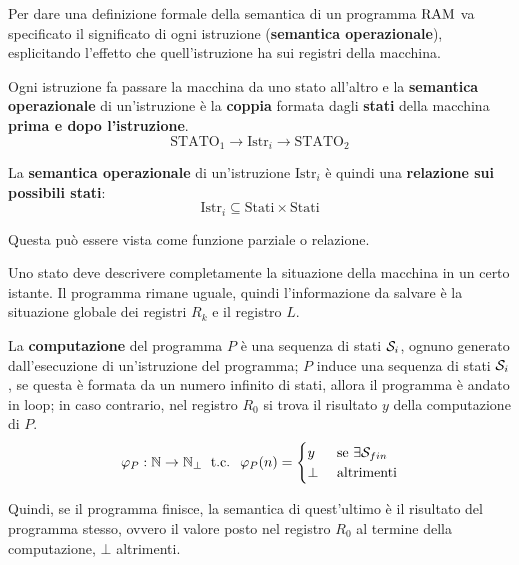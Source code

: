 Per dare una definizione formale della semantica di un programma $\text{RAM}$ va specificato il significato di ogni istruzione (\textbf{semantica operazionale}), esplicitando l'effetto che quell'istruzione ha sui registri della macchina.

Ogni istruzione fa passare la macchina da uno stato all'altro e la \textbf{semantica operazionale} di un'istruzione è la \textbf{coppia} formata dagli \textbf{stati} della macchina \textbf{prima e dopo l'istruzione}.
$$ \text{STATO}_1 \rightarrow \boxed{\text{Istr}_i} \rightarrow \text{STATO}_2 $$

La \textbf{semantica operazionale} di un'istruzione $\text{Istr}_i$ è quindi una \textbf{relazione sui possibili stati}:
$$
\text{Istr}_i \subseteq \text{Stati} \times \text{Stati}
$$

Questa può essere vista come funzione parziale o relazione.

Uno stato deve descrivere completamente la situazione della macchina in un certo istante. Il programma rimane uguale, quindi l'informazione da salvare è la situazione globale dei registri $R_k$ e il registro $L$.

La \textbf{computazione} del programma $P$ è una sequenza di stati $\mathcal{S}_i$, ognuno generato dall'esecuzione di un'istruzione del programma; $P$ induce una sequenza di stati $\mathcal{S}_i$, se questa è formata da un numero infinito di stati, allora il programma è andato in loop; in caso contrario, nel registro $R_0$ si trova il risultato $y$ della computazione di $P$.
$$ 
\varphi_P: \mathbb{N} \rightarrow \mathbb{N}_\bot \; \text{ t.c. } \; \varphi_P(n) = \begin{cases}
	y & \text{ se } \exists \mathcal{S}_{fin} \\
	\bot & \text{ altrimenti}
\end{cases}
$$

Quindi, se il programma finisce, la semantica di quest'ultimo è il risultato del programma stesso, ovvero il valore posto nel registro $R_0$ al termine della computazione, $\bot$ altrimenti.

